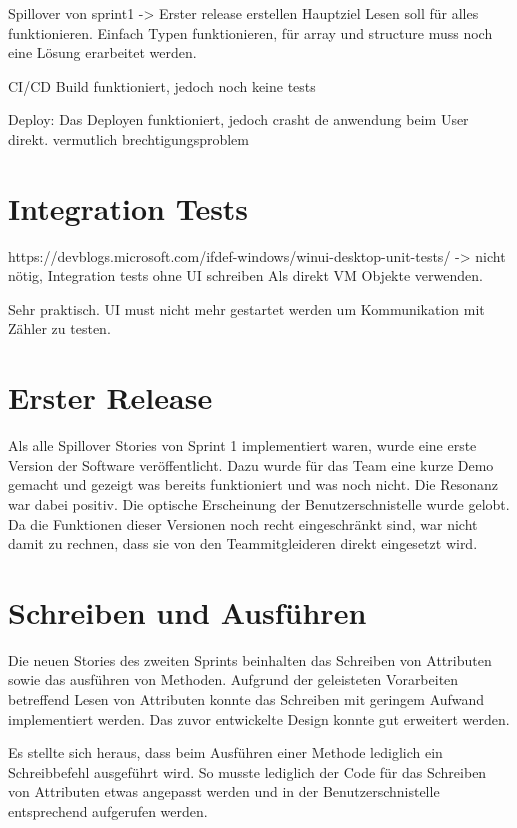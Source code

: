 
Spillover von sprint1
-> Erster release erstellen Hauptziel
Lesen soll für alles funktionieren.
Einfach Typen funktionieren, für array und structure muss noch eine Lösung erarbeitet werden.

CI/CD
Build funktioniert, jedoch noch keine tests

Deploy:
Das Deployen funktioniert, jedoch crasht de anwendung beim User direkt.
vermutlich brechtigungsproblem


\section{Integration Tests}
https://devblogs.microsoft.com/ifdef-windows/winui-desktop-unit-tests/
-> nicht nötig, Integration tests ohne UI schreiben
Als direkt VM Objekte verwenden.


Sehr praktisch. UI must nicht mehr gestartet werden um Kommunikation mit Zähler zu testen.


\section{Erster Release}
Als alle Spillover Stories von Sprint 1 implementiert waren, wurde eine erste Version der Software veröffentlicht.
Dazu wurde für das Team eine kurze Demo gemacht und gezeigt was bereits funktioniert und was noch nicht. 
Die Resonanz war dabei positiv. Die optische Erscheinung der Benutzerschnistelle wurde gelobt.
Da die Funktionen dieser Versionen noch recht eingeschränkt sind, war nicht damit zu rechnen, dass sie von den Teammitgleideren direkt eingesetzt wird.



\section{Schreiben und Ausführen}
Die neuen Stories des zweiten Sprints beinhalten das Schreiben von Attributen sowie das ausführen von Methoden.
Aufgrund der geleisteten Vorarbeiten betreffend Lesen von Attributen konnte das Schreiben mit geringem Aufwand implementiert werden.
Das zuvor entwickelte Design konnte gut erweitert werden.

Es stellte sich heraus, dass beim Ausführen einer Methode lediglich ein Schreibbefehl ausgeführt wird.
So musste lediglich der Code für das Schreiben von Attributen etwas angepasst werden und in der Benutzerschnistelle entsprechend aufgerufen werden.